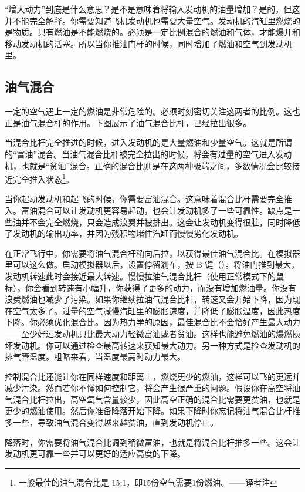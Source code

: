 “增大动力”到底是什么意思？是不是意味着将输入发动机的油量增加？是的，但这并不能完全解释。你需要知道飞机发动机也需要大量空气。发动机的汽缸里燃烧的是物质。只有燃油是不能燃烧的。必须是一定比例混合的燃油和气体，才能爆开和移动发动机的活塞。所以当你推油门杆的时候，同时增加了燃油和空气到发动机里。

\subsection*{油气混合}

一定的空气遇上一定的燃油是非常危险的。必须时刻密切关注这两者的比例。这也正是油气混合杆的作用。下图展示了油气混合比杆，已经拉出很多。

当混合比杆完全推进的时候，进入发动机的是大量燃油和少量空气。这就是所谓的“富油”混合。当油气混合比杆被完全拉出的时候，将会有过量的空气进入发动机，也就是“贫油”混合。正确的混合比则是在这两种极端之间，多数情况会比较接近完全推入状态\footnote{一般最佳的油气混合比是 15:1，即15份空气需要1份燃油。——译者注}。

当你起动发动机和起飞的时候，你需要富油混合。这意味着混合比杆需要完全推入。富油混合可以让发动机更容易起动，也会让发动机多了一些可靠性。缺点是一些油并不会完全燃烧，只会造成浪费并被排出。这会让发动机变得很脏，同时降低了发动机的输出功率，并因为残积物堵住汽缸而慢慢劣化发动机。

在正常飞行中，你需要将油气混合杆稍向后拉，以获得最佳油气混合比。在模拟器里可以这么做。启动模拟器以后，设置停留刹车，按 B 键（）。将油门推到最大，发动机转速此时会接近最大转速。慢慢拉油气混合比杆（使用正常模式下的鼠标）。你会看到转速有小幅升，你获得了更多的动力，而没有增加燃油量。你没有浪费燃油也减少了污染。如果你继续拉油气混合比杆，转速又会开始下降，因为现在空气太多了。过量的空气减慢汽缸里的膨胀速度，并降低了膨胀温度，因此热度下降。你必须优化混合比。因为热力学的原因，最佳混合比不会恰好产生最大动力——至少好过发动机只比最大动力轻微富油或者贫油。这样也能避免燃油的爆燃损坏发动机。你可以通过检查最高转速来获知最大动力。另一种方式是检查发动机的排气管温度。粗略来看，当温度最高时动力最大。

控制混合比还能让你在同样速度和距离上，燃烧更少的燃油，这样可以飞的更远并减少污染。然而若你不懂如何控制它，将会产生很严重的问题。假设你在高空将油气混合比杆拉出，高空氧气含量较少，因此高空正确的混合比需要更贫油，也就是更少的燃油使用。然后你准备降落开始下降。如果下降时你忘记将油气混合比杆推多一些，导致油气混合变得越来越贫油，直到发动机停止。

降落时，你需要将油气混合比调到稍微富油，也就是将混合比杆推多一些。这会让发动机更可靠一些并可以更好的适应高度的下降。


